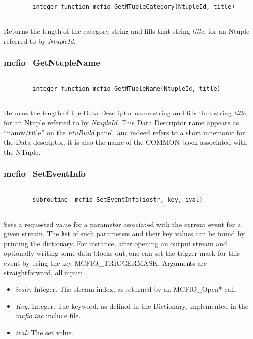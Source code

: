 \begin{verbatim}

        integer function mcfio_GetNTupleCategory(NtupleId, title)
        
\end{verbatim}

Returns the length of the category string and fills that string {\em
title}, for an Ntuple referred to by {\em NtupleId}.

\subsubsection{mcfio\_GetNtupleName}

\begin{verbatim}

        integer function mcfio_GetNTupleName(NtupleId, title)
        
\end{verbatim}

Returns the length of the Data Descriptor name string and fills that string {\em
title}, for an Ntuple referred to by {\em NtupleId}.  This Data Descriptor name appears as 
``namw/title'' on the {\em ntuBuild} panel, and indeed refers to a short mnemonic
for the Data descriptor, it is also the name of the COMMON block associated
with the NTuple.  


\subsubsection{mcfio\_SetEventInfo}

\begin{verbatim}

        subroutine  mcfio_SetEventInfo(iostr, key, ival)
    
\end{verbatim}

Sets a requested  value for a parameter associated with the current
event for a given stream. The list of such parameters and their key values 
can be found by printing the dictionary. For instance, after opening an output
stream and optionally writing some data blocks out, one can set the trigger
mask for this event by using the key 
MCFIO\_TRIGGERMASK. Arguments are straightforward, all input:

\begin{itemize}
\item {\em iostr:} Integer. The stream index, as returned by an MCFIO\_Open* 
call.
\item {\em Key:} Integer.  The keyword, as defined in the Dictionary, 
implemented in the {\em mcfio.inc} include file. 
\item {\em ival:} The  set value.
\end{itemize}

